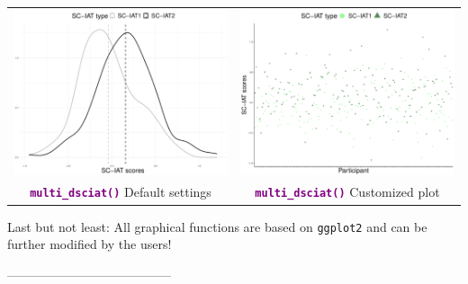 \documentclass[a0,landscape]{a0poster}
\begin{document}
\begin{multicols*}{3}
\begin{tabular}{c c}
	\includegraphics[width=0.5\linewidth]{sciatDefault.pdf}
	&
	\includegraphics[width=0.5\linewidth]{multiSciatPoints.pdf} \\
	\textbf{\textcolor{purple}{\texttt{multi\_dsciat()}}}  Default settings & \textbf{\textcolor{purple}{\texttt{multi\_dsciat()}}} Customized plot\\
\end{tabular}

\vspace{5mm}

\textcolor{title}{Last but not least:} All graphical functions are based on \texttt{ggplot2} \cite{ggplot2} and can be further modified by the users! 

\vspace{5mm}
---------------------------------------
\footnotesize


\end{multicols*}
\end{document}
